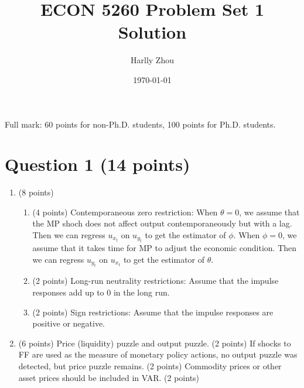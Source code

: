 \documentclass[12pt]{article}
\title{ECON 5260 Problem Set 1 Solution}
\author{Harlly Zhou}
\date{\today}
\begin{document}
\maketitle

Full mark: 60 points for non-Ph.D. students, 100 points for Ph.D. students.
\section*{Question 1 (14 points)}
\begin{enumerate}[label=\arabic*.]
    \item (8 points)\begin{enumerate}[label=\alph*.]
        \item (4 points) Contemporaneous zero restriction: When $\theta = 0$, we assume that the MP shoch does not affect output contemporaneously but with a lag. Then we can regress $u_{x_t}$ on $u_{y_t}$ to get the estimator of $\phi$. When $\phi=0$, we assume that it takes time for MP to adjust the economic condition. Then we can regress $u_{y_t}$ on $u_{x_t}$ to get the estimator of $\theta$.
        \item (2 points) Long-run neutrality restrictions: Assume that the impulse responses add up to 0 in the long run. 
        \item (2 points) Sign restrictions: Assume that the impulse responses are positive or negative.
    \end{enumerate}
    \item (6 points) Price (liquidity) puzzle and output puzzle. (2 points) If shocks to FF are used as the measure of monetary policy actions, no output puzzle was detected, but price puzzle remains. (2 points) Commodity prices or other asset prices should be included in VAR. (2 points)
\end{enumerate}
\end{document}
